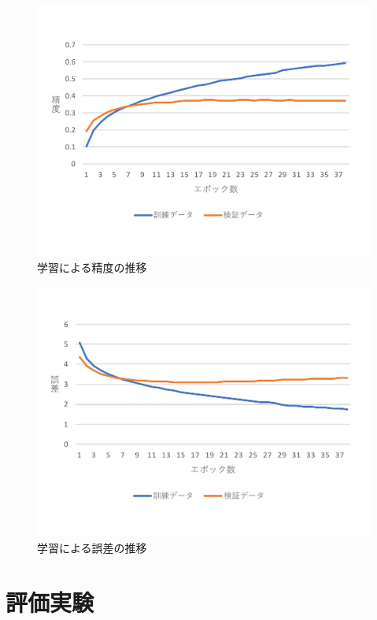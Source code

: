 \documentclass[a4paper,11pt,oneside,openany]{jsbook}
\begin{document}
\begin{figure}[htb]
	\begin{center} %
		\includegraphics [width = 120mm] {figures/author_result.pdf} %
	\end{center}
	\caption{学習による精度の推移} %
	\label{fig:author_result1} %
\end{figure}
\begin{figure}[htb]
	\begin{center} %
		\includegraphics [width = 120mm] {figures/author_result2.pdf} %
	\end{center}
	\caption{学習による誤差の推移} %
	\label{fig:author_result2} %
\end{figure}

	\section{評価実験}
\end{document}
